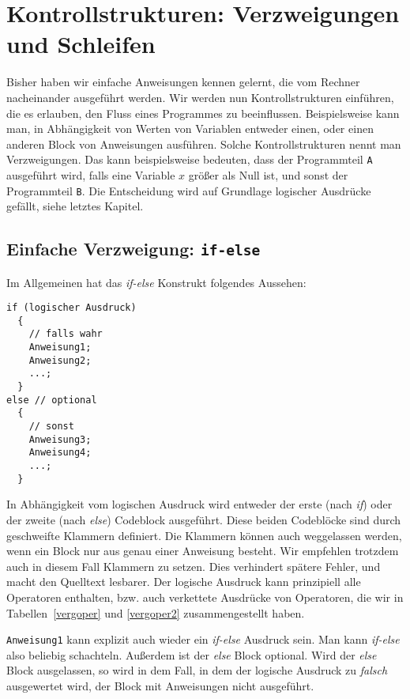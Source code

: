 \section{Kontrollstrukturen: Verzweigungen und Schleifen}

Bisher haben wir einfache Anweisungen kennen gelernt, die vom Rechner nacheinander ausgeführt werden.
Wir werden nun Kontrollstrukturen einführen, die es erlauben, den Fluss eines Programmes zu beeinflussen.
Beispielsweise kann man, in Abhängigkeit von Werten von Variablen entweder einen, oder einen anderen Block von Anweisungen ausführen.
Solche Kontrollstrukturen nennt man Verzweigungen.
Das kann beispielsweise bedeuten, dass der Programmteil \texttt{A} ausgeführt wird, falls eine Variable $x$ größer als Null ist, und sonst der Programmteil \texttt{B}.
Die Entscheidung wird auf Grundlage logischer Ausdrücke gefällt, siehe letztes Kapitel.

\subsection{Einfache Verzweigung: \texttt{if-else}}

Im Allgemeinen hat das \emph{if-else} Konstrukt folgendes Aussehen:
\begin{lstlisting}[caption={if-else Statement}, belowcaptionskip=0.3em]
if (logischer Ausdruck)
  {
    // falls wahr
    Anweisung1;
    Anweisung2;
    ...;
  }
else // optional
  {
    // sonst
    Anweisung3;
    Anweisung4;
    ...;
  }
\end{lstlisting}
In Abhängigkeit vom logischen Ausdruck wird entweder der erste (nach \emph{if}) oder der zweite (nach \emph{else}) Codeblock ausgeführt.
Diese beiden Codeblöcke sind durch geschweifte Klammern definiert.
Die Klammern können auch weggelassen werden, wenn ein Block nur aus genau einer Anweisung besteht.
Wir empfehlen trotzdem auch in diesem Fall Klammern zu setzen.
Dies verhindert spätere Fehler, und macht den Quelltext lesbarer.
Der logische Ausdruck kann prinzipiell alle Operatoren enthalten, bzw. auch verkettete Ausdrücke von Operatoren, die wir in Tabellen~\ref{vergoper} und \ref{vergoper2} zusammengestellt haben.

\verb|Anweisung1| kann explizit auch wieder ein \emph{if-else} Ausdruck sein. 
Man kann \emph{if-else} also beliebig schachteln.
Außerdem ist der \emph{else} Block optional.
Wird der \emph{else} Block ausgelassen, so wird in dem Fall, in dem der logische Ausdruck zu \emph{falsch} ausgewertet wird, der Block mit Anweisungen nicht ausgeführt.

